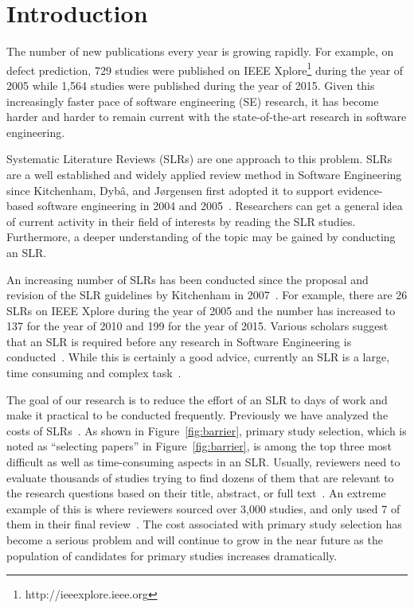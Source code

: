 \documentclass[final,twocolumn,5p]{elsarticle}
\theoremstyle{break}
\begin{document}
\section{Introduction}
\label{sect: Introduction}

 The
number of new publications every year is growing rapidly. For example, on defect
prediction, 729 studies were published on IEEE
Xplore\footnote{http://ieeexplore.ieee.org} during the year of 2005 while 1,564
studies were published during the year of 2015.
Given this increasingly faster pace of software engineering (SE) research,
it has become harder and harder to remain current with
the state-of-the-art research in software engineering.

Systematic Literature Reviews
(SLRs) are one approach to this problem. SLRs are a well established and widely
applied review method in Software Engineering since Kitchenham, Dyb{\^{a}}, and
J{\o}rgensen first adopted it to support evidence-based software engineering in
2004 and 2005~\cite{kitchenham2004evidence,1377125}. 
Researchers can get a
general idea of current activity in their field of interests by reading the SLR
studies. Furthermore, a
deeper understanding of the topic may be gained by conducting an SLR.

An increasing number of SLRs has been conducted since the proposal and
revision of the SLR guidelines by Kitchenham in 2007~\cite{keele2007guidelines}. For
example, there are 26 SLRs on IEEE Xplore during the year of 2005 and the
number has increased to 137 for the year of 2010 and 199 for the year of
2015. Various scholars  suggest that an SLR is required before any research in Software
Engineering is conducted~\cite{keele2007guidelines}.
While this is certainly a good advice,
currently an SLR is
a large, time consuming and complex
task~\cite{hassler2016identification,hassler2014outcomes,carver2013identifying,bowes2012slurp}.

The
goal of our research is to reduce the effort of an SLR to days of work and
make it practical to be conducted frequently.
Previously we have analyzed the costs of SLRs~\cite{hassler2014outcomes,carver2013identifying}. As shown in Figure~\ref{fig:barrier}, primary study selection, which is noted as ``selecting papers'' in Figure~\ref{fig:barrier}, is among the top three most difficult
as well as time-consuming aspects in an SLR. Usually, reviewers need to evaluate
thousands of studies trying to find dozens of them that are relevant to the
research questions based on their title, abstract, or full text~\cite{bowes2012slurp}. An extreme
example of this is where reviewers sourced over
3,000 studies, and only used 7 of them in their final review~\cite{bezerra2009systematic}. The cost associated with primary study selection has become a
serious problem and will continue to grow in the near future
 as the population of candidates for primary
studies increases dramatically.
\end{document}
